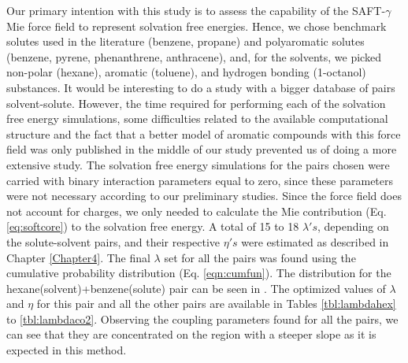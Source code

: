Our primary intention with this study is to assess the capability of the SAFT-$\gamma$ Mie force field to represent solvation free energies. Hence, we chose benchmark solutes used in the literature (benzene, propane) and polyaromatic solutes (benzene, pyrene, phenanthrene, anthracene), and, for the solvents, we picked non-polar (hexane), aromatic (toluene), and hydrogen bonding (1-octanol) substances. It would be interesting to do a study with a bigger database of pairs solvent-solute. However, the time required for performing each of the solvation free energy simulations, some difficulties related to the available computational structure and the fact that a better model of aromatic compounds with this force field was only published in the middle of our study prevented us of doing a more extensive study. The solvation free energy simulations for the pairs chosen were carried with binary interaction parameters equal to zero, since these parameters were not necessary according to our preliminary studies. Since the force field does not account for charges, we only needed to calculate the Mie contribution (Eq. \eqref{eq:softcore}) to the solvation free energy. A total of 15 to 18 $\lambda 's$, depending on the solute-solvent pairs, and their respective $\eta 's$ were estimated as described in Chapter \ref{Chapter4}. The final $\lambda$ set for all the pairs was found using the cumulative probability distribution (Eq. \eqref{eqn:cumfun}). The distribution for the hexane(solvent)+benzene(solute) pair can be seen in . The optimized values of $\lambda$ and $\eta$ for this pair and all the other pairs are available in Tables \ref{tbl:lambdahex} to \ref{tbl:lambdaco2}. Observing the coupling parameters found for all the pairs, we can see that they are concentrated on the region with a steeper slope as it is expected in this method.


